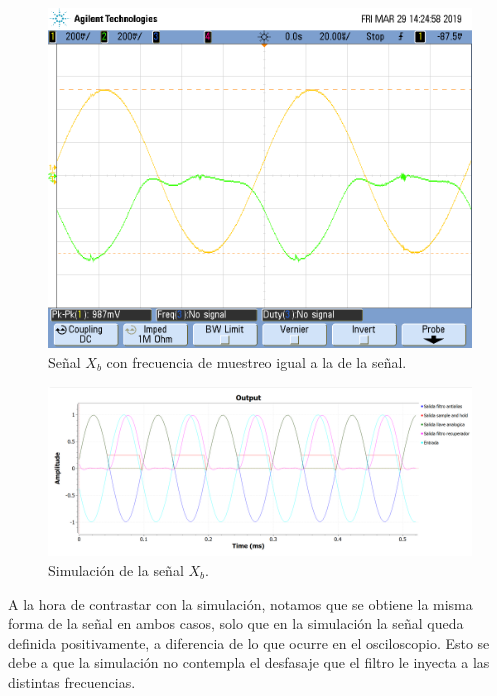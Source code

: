 \documentclass[../../ASSD_TP1_G7.tex]{subfiles}
\begin{document}
\begin{figure}[H]
\begin{centering}
\includegraphics[scale=0.3]{Imagenes/llave_senooo_pto_c}\caption{Señal $X_{b}$ con frecuencia de muestreo igual a la de la señal.}
\par\end{centering}
\end{figure}

\begin{figure}[H]

\begin{centering}
\includegraphics[scale=0.5]{Imagenes/simulacion_llave_seno_c.PNG}\caption{Simulación de la señal $X_{b}$.}
\par\end{centering}
\end{figure}

A la hora de contrastar con la simulación, notamos que se obtiene
la misma forma de la señal en ambos casos, solo que en la simulación
la señal queda definida positivamente, a diferencia de lo que ocurre
en el osciloscopio. Esto se debe a que la simulación no contempla
el desfasaje que el filtro le inyecta a las distintas frecuencias.
\end{document}
